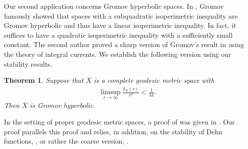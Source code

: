 \documentclass[a4paper,leqno]{amsart}
\numberwithin{equation}{section}
\newtheorem{theorem}{Theorem}[section]
\theoremstyle{remark}
\theoremstyle{remark}
\begin{document}
%

Our second application concerns Gromov hyperbolic spaces. In \cite{gromov-1987-hyperbolic-groups}, Gromov famously showed that spaces with a subquadratic isoperimetric inequality are Gromov hyperbolic and thus have a linear isoperimetric inequality. In fact, it suffices to have a quadratic isoperimetric inequality with a sufficiently small constant. The second author proved a sharp version of Gromov's result in \cite{wenger-2008-gromov-hyperbolic-spaces-and-the-sharp-isoperimetric-constant} using the theory of integral currents. We establish the following version using our stability results.
\begin{theorem}\label{theorem-gromov's-theorem-introduction}
Suppose that $X$ is a complete geodesic metric space with
\begin{align*}
    \limsup_{ r \rightarrow \infty } \frac{ \delta_{X}(r) }{ r^2 } < \frac{1}{4\pi}.
\end{align*}
Then $X$ is Gromov hyperbolic.
\end{theorem}
In the setting of proper geodesic metric spaces, a proof of  was given in \cite{Lyt:Wen:You:20}. Our proof parallels this proof and relies, in addition, on the stability of Dehn functions, , or rather the coarse version, . 

\end{document}
